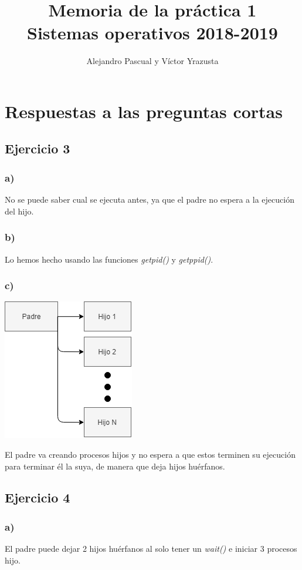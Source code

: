 \documentclass[]{article}
\title{Memoria de la práctica 1 \\
	\Large Sistemas operativos 2018-2019}
\author{Alejandro Pascual y V\'ictor Yrazusta}
\begin{document}
\maketitle

\section*{Respuestas a las preguntas cortas}
\subsection*{Ejercicio 3}
\subsubsection*{a)}
No se puede saber cual se ejecuta antes,
ya que el padre no espera a la ejecución del hijo.

\subsubsection*{b)}
Lo hemos hecho usando las funciones \textit{getpid()} y \textit{getppid()}.

\subsubsection*{c)}
\begin{center}
\includegraphics[scale=0.75]{3c.png}
\end{center}
El padre va creando procesos hijos y no espera a que estos terminen su ejecución para terminar él la suya, de manera que deja hijos huérfanos. 

\subsection*{Ejercicio 4}
\subsubsection*{a)}
El padre puede dejar 2 hijos huérfanos al solo tener un \textit{wait()} e iniciar 3 procesos hijo.
\end{document}
